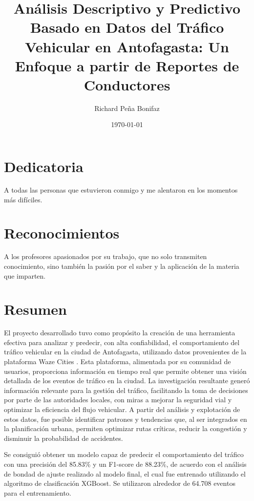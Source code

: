 \documentclass[12pt]{article}
\begin{document}
\title{Análisis Descriptivo y Predictivo Basado en Datos del Tráfico Vehicular en Antofagasta: Un Enfoque a partir de Reportes de Conductores}
\author{Richard Peña Bonifaz}
\date{\today}
\maketitle

\section*{Dedicatoria}

A todas las personas que estuvieron conmigo y me alentaron en los momentos más difíciles.

\section*{Reconocimientos}

A los profesores apasionados por su trabajo, que no solo transmiten conocimiento, sino también la pasión por el saber y la aplicación de la materia que imparten.

\newpage
\tableofcontents
\newpage

\section*{Resumen}

El proyecto desarrollado tuvo como propósito la creación de una herramienta efectiva para analizar y predecir, con alta confiabilidad, el comportamiento del tráfico vehicular en la ciudad de Antofagasta, utilizando datos provenientes de la plataforma Waze Cities \citep{wazecities2024}. Esta plataforma, alimentada por su comunidad de usuarios, proporciona información en tiempo real que permite obtener una visión detallada de los eventos de tráfico en la ciudad. La investigación resultante generó información relevante para la gestión del tráfico, facilitando la toma de decisiones por parte de las autoridades locales, con miras a mejorar la seguridad vial y optimizar la eficiencia del flujo vehicular. A partir del análisis y explotación de estos datos, fue posible identificar patrones y tendencias que, al ser integrados en la planificación urbana, permiten optimizar rutas críticas, reducir la congestión y disminuir la probabilidad de accidentes.

Se consiguió obtener un modelo capaz de predecir el comportamiento del tráfico con una precisión del 85.83\% y un F1-score de 88.23\%, de acuerdo con el análisis de bondad de ajuste realizado al modelo final, el cual fue entrenado utilizando el algoritmo de clasificación XGBoost. Se utilizaron alrededor de 64.708 eventos para el entrenamiento.
\end{document}
